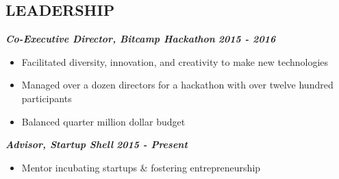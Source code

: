 \documentclass{res}
\begin{document}
\begin{resume}
\section{LEADERSHIP}
  	{\bfseries {\em Co-Executive Director, Bitcamp Hackathon}} \hfill {\bfseries {\em 2015 - 2016}} \
		\begin{itemize} \itemsep -2pt
		\item Facilitated diversity, innovation, and creativity to make new technologies
		\item Managed over a dozen directors for a hackathon with over twelve hundred participants
		\item Balanced quarter million dollar budget
		\end{itemize}
	{\bfseries {\em Advisor, Startup Shell}} \hfill {\bfseries {\em 2015 - Present}} \
		\begin{itemize} \itemsep -2pt
		\item Mentor incubating startups \& fostering entrepreneurship
		\end{itemize}

\end{resume}
\end{document}
